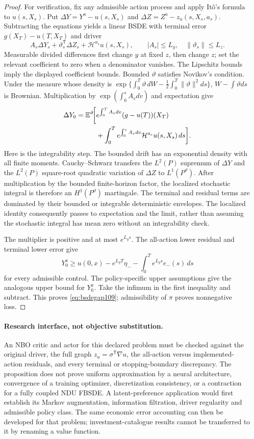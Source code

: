 \begin{proof}
For verification, fix any admissible action process and apply It\^o's formula to $u(s,X_s)$. Put $\Delta Y=Y^a-u(s,X_s)$ and $\Delta Z=Z^a-z_u(s,X_s,a_s)$. Subtracting the equations yields a linear BSDE with terminal error $g(X_T)-u(T,X_T)$ and driver
\[
 A_s\Delta Y_s+\vartheta_s^{\mathsf T}\Delta Z_s+\mathcal H^{a_s}u(s,X_s),
 \qquad |A_s|\le L_y,\quad\|\vartheta_s\|\le L_z.
\]
Measurable divided differences first change $y$ at fixed $z$, then change $z$; set the relevant coefficient to zero when a denominator vanishes. The Lipschitz bounds imply the displayed coefficient bounds. Bounded $\vartheta$ satisfies Novikov's condition. Under the measure whose density is
$\exp\{\int_0^T\vartheta\,dW-\tfrac12\int_0^T\|\vartheta\|^2ds\}$,
$W-\int\vartheta ds$ is Brownian. Multiplication by $\exp(\int_0^sA_vdv)$ and expectation give
\begin{align*}
 \Delta Y_0=\mathbb E^{\vartheta}\!\bigg[&
 e^{\int_0^TA_vdv}(g-u(T))(X_T)\\
 &+\int_0^T e^{\int_0^sA_vdv}\mathcal H^{a_s}u(s,X_s)\,ds\bigg].
\end{align*}
Here is the integrability step. The bounded drift has an exponential density with all finite moments. Cauchy--Schwarz transfers the $L^2(P)$ supremum of $\Delta Y$ and the $L^2(P)$ square-root quadratic variation of $\Delta Z$ to $L^1(P^{\vartheta})$. After multiplication by the bounded finite-horizon factor, the localized stochastic integral is therefore an $H^1(P^{\vartheta})$ martingale. The terminal and residual terms are dominated by their bounded or integrable deterministic envelopes. The localized identity consequently passes to expectation and the limit, rather than assuming the stochastic integral has mean zero without an integrability check.

The multiplier is positive and at most $e^{L_ys}$. The all-action lower residual and terminal lower error give
\[
 Y_0^a\ge u(0,x)-e^{L_yT}\eta_- -\int_0^Te^{L_ys}e_-(s)\,ds
\]
for every admissible control. The policy-specific upper assumptions give the analogous upper bound for $Y_0^\pi$. Take the infimum in the first inequality and subtract. This proves \eqref{eq:bsdegap109}; admissibility of $\pi$ proves nonnegative loss.
\end{proof}

\paragraph{Research interface, not objective substitution.}
An NBO critic and actor for this declared problem must be checked against the original driver, the full graph $z_u=\sigma^{\mathsf T}\nabla u$, the all-action versus implemented-action residuals, and every terminal or stopping-boundary discrepancy. The proposition does not prove uniform approximation by a neural architecture, convergence of a training optimizer, discretization consistency, or a contraction for a fully coupled NDU FBSDE. A latent-preference application would first establish its Markov augmentation, information filtration, driver regularity and admissible policy class. The same economic error accounting can then be developed for that problem; investment-catalogue results cannot be transferred to it by renaming a value function.
